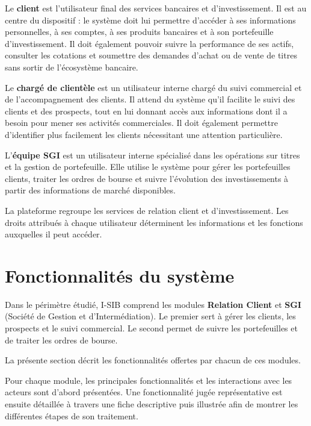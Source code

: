Le \textbf{client} est l'utilisateur final des services bancaires et d'investissement. Il
est au centre du dispositif : le système doit lui permettre d'accéder à ses informations
personnelles, à ses comptes, à ses produits bancaires et à son portefeuille
d'investissement. Il doit également pouvoir suivre la performance de ses actifs, consulter
les cotations et soumettre des demandes d'achat ou de vente de titres sans sortir de
l'écosystème bancaire.

Le \textbf{chargé de clientèle} est un utilisateur interne chargé du suivi commercial et
de l'accompagnement des clients.
Il attend du système qu'il facilite le suivi des clients et des prospects, tout en lui donnant accès aux informations dont il a besoin pour mener ses activités commerciales.
Il doit également permettre d'identifier plus facilement les clients nécessitant une attention particulière.

L'\textbf{équipe SGI} est un utilisateur interne spécialisé dans les opérations sur titres et la gestion de portefeuille. Elle utilise le système pour gérer les portefeuilles clients, traiter les ordres de bourse et suivre l'évolution des investissements à partir des informations de marché disponibles.

La plateforme regroupe les services de relation client et d'investissement. Les
droits attribués à chaque utilisateur déterminent les informations et les
fonctions auxquelles il peut accéder.

\section{Fonctionnalités du système}

Dans le périmètre étudié, I-SIB comprend les modules \textbf{Relation Client} et
\textbf{SGI} (Société de Gestion et d'Intermédiation). Le premier sert à gérer
les clients, les prospects et le suivi commercial. Le second permet de suivre
les portefeuilles et de traiter les ordres de bourse.


 La présente section décrit les fonctionnalités offertes par chacun de ces modules.

Pour chaque module, les principales fonctionnalités et les interactions avec les acteurs sont d'abord présentées. Une fonctionnalité jugée représentative est ensuite détaillée à travers une fiche descriptive puis illustrée afin de montrer les différentes étapes de son traitement.



